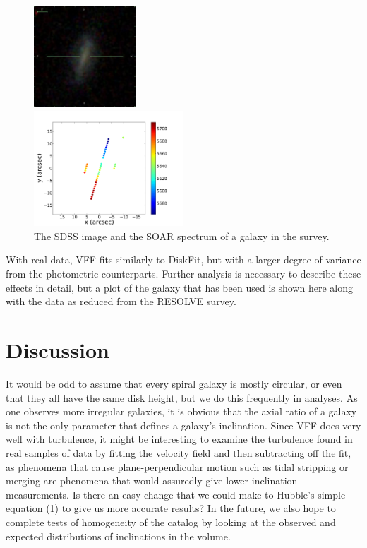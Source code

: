 \documentclass{emulateapj}
\begin{document}
\begin{figure}[h]
\begin{center}
\includegraphics[width=0.34\textwidth]{tinygal.jpg}
\end{center}
\includegraphics[width=0.5\textwidth]{rawvels.pdf}
\caption{The SDSS image and the SOAR spectrum of a galaxy in the survey. \label{fig:test}}
\end{figure}

\large With real data, VFF fits similarly to DiskFit, but with a larger degree of variance from the photometric counterparts. Further analysis is necessary to describe these effects in detail, but a plot of the galaxy that has been used is shown here along with the data as reduced from the RESOLVE survey.



\section{Discussion}
\large It would be odd to assume that every spiral galaxy is mostly circular, or even that they all have the same disk height, but we do this frequently in analyses. As one observes more irregular galaxies, it is obvious that the axial ratio of a galaxy is not the only parameter that defines a galaxy's inclination. Since VFF does very well with turbulence, it might be interesting to examine the turbulence found in real samples of data by fitting the velocity field and then subtracting off the fit, as phenomena that cause plane-perpendicular motion such as tidal stripping or merging are phenomena that would assuredly give lower inclination measurements. Is there an easy change that we could make to Hubble's simple equation (1) to give us more accurate results? In the future, we also hope to complete tests of homogeneity of the catalog by looking at the observed and expected distributions of inclinations in the volume.
\end{document}
